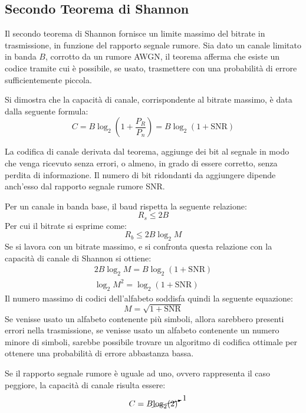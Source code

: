 \documentclass{article}
\numberwithin{equation}{subsection}
\begin{document}
\subsection{Secondo Teorema di Shannon}

Il secondo teorema di Shannon fornisce un limite massimo del bitrate in trasmissione, in funzione del rapporto segnale rumore. 
Sia dato un canale limitato in banda $B$, corrotto da un rumore AWGN, il teorema afferma che esiste un codice tramite cui è possibile, se usato, trasmettere con una 
probabilità di errore sufficientemente piccola. 

Si dimostra che la capacità di canale, corrispondente al bitrate massimo, è data dalla seguente formula:
\begin{equation}
    C=B\log_2\left(\displaystyle1+\frac{P_R}{P_n}\right)=B\log_2(1+\mathrm{SNR})
\end{equation}

La codifica di canale derivata dal teorema, aggiunge dei bit al segnale in modo che venga ricevuto senza errori, o almeno, in grado di essere corretto, senza perdita di 
informazione. Il numero di bit ridondanti da aggiungere dipende anch'esso dal rapporto segnale rumore SNR. 

Per un canale in banda base, il baud rispetta la seguente relazione:
\begin{equation*}
    R_s\leq 2B
\end{equation*}
Per cui il bitrate si esprime come:
\begin{equation*}
    R_b\leq 2B\log_2M
\end{equation*}
Se si lavora con un bitrate massimo, e si confronta questa relazione con la capacità di canale di Shannon si ottiene:
\begin{gather*}
    2B\log_2M=B\log_2(1+\mathrm{SNR})\\
    \log_2M^2=\log_2(1+\mathrm{SNR})
\end{gather*}
Il numero massimo di codici dell'alfabeto soddisfa quindi la seguente equazione:
\begin{equation}
    M=\sqrt{1+\mathrm{SNR}}
\end{equation}
Se venisse usato un alfabeto contenente più simboli, allora sarebbero presenti errori nella trasmissione, se venisse usato un alfabeto contenente un numero minore di simboli, 
sarebbe possibile trovare un algoritmo di codifica ottimale per ottenere una probabilità di errore abbastanza bassa. 


Se il rapporto segnale rumore è uguale ad uno, ovvero rappresenta il caso peggiore, la capacità di canale risulta essere:
\begin{gather*}
    C=B\cancelto{1}{\log_2(2)}
\end{gather*}
\end{document}
